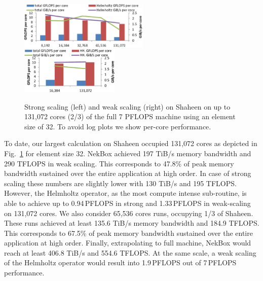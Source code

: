 \begin{figure}[!t]
\centering
\includegraphics[width=0.55\textwidth]{gfx/shaheen_strong}
~
\includegraphics[width=0.42\textwidth]{gfx/shaheen_weak}
\caption{Strong scaling (left) and weak scaling (right) on Shaheen on up to 131,072  cores (2/3) of the full 7 PFLOPS machine using 
an element size of 32.
To avoid log plots we show per-core performance.}
\label{fig:shaheen_scaling}
\end{figure}

To date, our largest calculation on Shaheen occupied 131,072 cores as depicted in Fig.~\ref{fig:shaheen_scaling}
for element size 32.
NekBox achieved 197 TiB/s memory bandwidth and 290 TFLOPS in weak scaling.
This corresponds to 47.8\% of peak memory bandwidth sustained over the entire application at high order.
In case of strong scaling these numbers are slightly lower with 130 TiB/s and 195 TFLOPS. 
However, the Helmholtz operator, as the most compute intense sub-routine, is able to achieve
up to 0.94\,PFLOPS in strong and 1.33\,PFLOPS
 in weak-scaling on 131,072 cores. %
We also consider 65,536 cores runs, occupying 1/3 of Shaheen.
These runs achieved at least 135.6 TiB/s memory bandwidth and 184.9 TFLOPS.
This corresponds to 67.5\% of peak memory bandwidth sustained over the entire application at high order.
Finally, extrapolating to full machine, NekBox would reach at least 406.8 TiB/s and 554.6 TFLOPS. At the same scale,
a weak scaling of the Helmholtz operator would result into 1.9\,PFLOPS out of 7\,PFLOPS performance.



